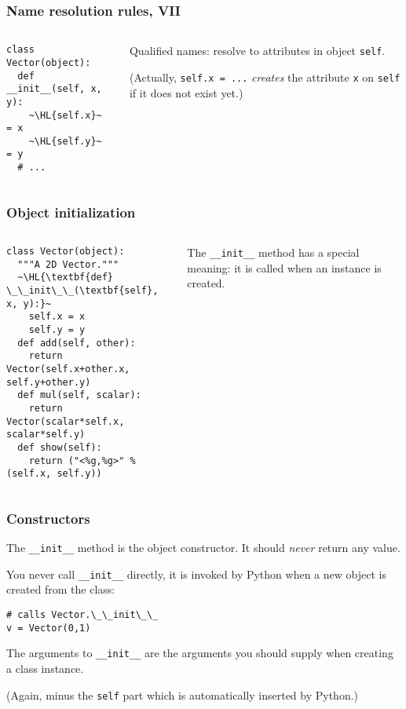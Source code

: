 \documentclass[english,serif,mathserif,xcolor=pdftex,dvipsnames,table]{beamer}
\begin{document}
\begin{frame}[fragile]
  \frametitle{Name resolution rules, VII}
  \begin{columns}
    \begin{column}[t]{0.6\linewidth}
\begin{lstlisting}
class Vector(object):
  def __init__(self, x, y):
    ~\HL{self.x}~ = x
    ~\HL{self.y}~ = y
  # ...
\end{lstlisting}
    \end{column}
    \begin{column}[t]{0.4\linewidth}
      \raggedleft
      Qualified names: resolve to attributes in object \lstinline|self|.

      \+ (Actually, \lstinline|self.x = ...| \emph{creates} the
      attribute \lstinline|x| on \lstinline|self| if it does not exist
      yet.)
    \end{column}
  \end{columns}

\end{frame}


\begin{frame}[fragile]
  \frametitle{Object initialization}
  \begin{columns}[t]
    \begin{column}{0.5\textwidth}
\begin{lstlisting}
class Vector(object):
  """A 2D Vector."""
  ~\HL{\textbf{def} \_\_init\_\_(\textbf{self}, x, y):}~
    self.x = x
    self.y = y
  def add(self, other):
    return Vector(self.x+other.x, self.y+other.y)
  def mul(self, scalar):
    return Vector(scalar*self.x, scalar*self.y)
  def show(self):
    return ("<%g,%g>" % (self.x, self.y))
\end{lstlisting}
    \end{column}
    \begin{column}{0.5\textwidth}
      \raggedleft
      The \lstinline|__init__| method has a special
      meaning: it is called when an instance is created.
    \end{column}
  \end{columns}
\end{frame}



\begin{frame}[fragile]
  \frametitle{Constructors}

  The \lstinline|__init__| method is the object constructor.
  It should \emph{never} return any value.

  \+
  You never call \lstinline|__init__| directly, it is invoked by
  Python when a new object is created from the class:
\begin{lstlisting}
# calls Vector.\_\_init\_\_
v = Vector(0,1)
\end{lstlisting}

  \+
  The arguments to \lstinline|__init__| are the arguments you
  should supply when creating a class instance.

  \+
  (Again, minus the \texttt{self} part which is automatically
  inserted by Python.)
\end{frame}
\end{document}
